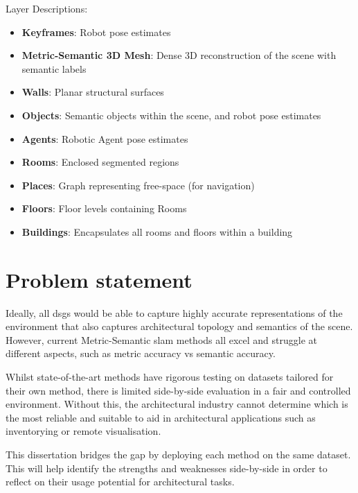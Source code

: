 Layer Descriptions:
\begin{itemize}
  \item \textbf{Keyframes}: Robot pose estimates
  \item \textbf{Metric-Semantic 3D Mesh}: Dense 3D reconstruction of the scene with semantic labels
  \item \textbf{Walls}: Planar structural surfaces
  \item \textbf{Objects}: Semantic objects within the scene, and robot pose estimates
  \item \textbf{Agents}: Robotic Agent pose estimates
  \item \textbf{Rooms}: Enclosed segmented regions
  \item \textbf{Places}: Graph representing free-space (for navigation)
  \item \textbf{Floors}: Floor levels containing Rooms
  \item \textbf{Buildings}: Encapsulates all rooms and floors within a building
\end{itemize}


\section{Problem statement}\label{sec:problem}

Ideally, all \gls{dsg}s would be able to capture highly accurate representations of the environment 
that also captures architectural topology and semantics of the scene. However, current 
Metric-Semantic \gls{slam} methods all excel and struggle at different aspects, such as metric accuracy vs semantic accuracy. 

Whilst state-of-the-art 
methods have rigorous testing on datasets tailored for their own method, there 
is limited side-by-side evaluation in a fair and controlled environment. Without this, the 
architectural industry cannot determine which is the most reliable and suitable to aid in 
architectural applications such as inventorying or remote visualisation.

This dissertation bridges the gap by deploying each method on the same dataset. This will help identify the strengths and weaknesses side-by-side 
in order to reflect on their usage potential for architectural tasks.


